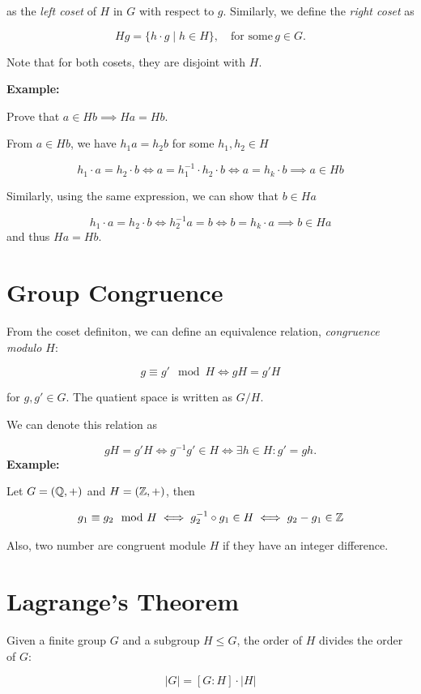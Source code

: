 as the \emph{left coset} of \(H\) in \(G\) with respect to \(g\). Similarly, we define the \emph{right coset} as

\[
	Hg = \{h \cdot g \mid h \in H\}, \quad \text{for some}\, g \in G.
\]

Note that for both cosets, they are disjoint with \(H\).

\textbf{Example:}

Prove that \(a \in Hb \implies Ha = Hb\).

From \(a \in Hb\), we have \(h_1a = h_2b\) for some \(h_1, h_2 \in H\)

\[
	h_1 \cdot a = h_2 \cdot b \iff a = h_1^{-1} \cdot h_2 \cdot b \iff a = h_k \cdot b \implies a \in Hb
\]

Similarly, using the same expression, we can show that \(b \in Ha\)

\[
	h_1 \cdot a = h_2 \cdot b \iff h_2^{-1} a =  b \iff b = h_k \cdot a \implies b \in Ha
\]
and thus \(Ha = Hb\).

\QED

\section{Group Congruence}

From the coset definiton, we can define an equivalence relation, \emph{congruence modulo \(H\)}:

\[
	g \equiv g' \mod H \iff gH = g'H
\]

for \(g, g' \in G\). The quatient space is written as \(G/H\).

We can denote this relation as

\[
	gH = g'H \iff g^{-1}g' \in H \iff \exists h \in H: g' = gh.
\]
\textbf{Example:}

Let \(G = (\mathbb{Q}, +)\) and \(H = (\mathbb{Z}, +)\), then

\[
	g_1 \equiv g_2 \mod H \iff g_2^{-1} \circ g_1 \in H \iff g_2 - g_1 \in \mathbb{Z}
\]

Also, two number are congruent module \(H\) if they have an integer difference.

\section{Lagrange's Theorem}

Given a finite group \(G\) and a subgroup \(H \leq G\), the order of \(H\) divides the order of \(G\):

\[
	|G| = [G : H] \cdot |H|
\]

